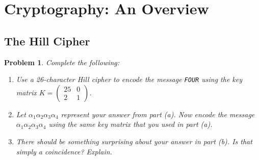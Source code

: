 \documentclass[12pt]{article}
\newtheorem{problem}{Problem}
\theoremstyle{remark}  %
\begin{document}
\setlength{\abovecaptionskip}{0pt} %
%


\rhead{\today}
\section{Cryptography: An Overview}
\setcounter{subsection}{3}
\subsection{The Hill Cipher}
    \begin{problem}
        Complete the following:
        \begin{enumerate}[label=(\alph*)]
            \item Use a 26-character Hill cipher to encode the message \texttt{FOUR} using the key matrix $K=\begin{pmatrix}
                25 & 0 \\
                2 & 1
            \end{pmatrix}$.
            \item Let $\alpha_{1}\alpha_{2}\alpha_{3}\alpha_{4}$ represent your answer from part (a). Now encode the message $\alpha_{1}\alpha_{2}\alpha_{3}\alpha_{4}$ using the same key matrix that you used in part (a).
            \item There should be something surprising about your answer in part (b). Is that simply a coincidence? Explain.
        \end{enumerate}
    \end{problem}
\end{document}
